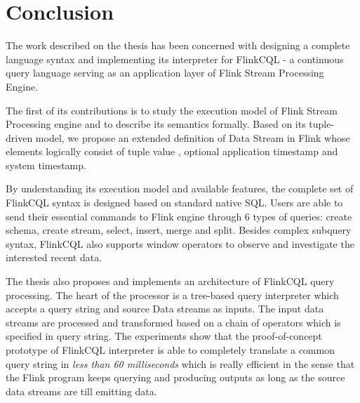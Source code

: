 
\chapter{Conclusion}

\ifpdf
    \graphicspath{{Chapter06/Figs/Raster/}{Chapter06/Figs/PDF/}{Chapter06/Figs/}}
\else
    \graphicspath{{Chapter06/Figs/Vector/}{Chapter06/Figs/}}
\fi


The work described on the thesis has been concerned with  designing  a complete language syntax and implementing its interpreter for FlinkCQL - a continuous query language serving as an application layer of Flink Stream Processing Engine. 

The first of its contributions is to study the execution model of Flink Stream Processing engine and to describe its semantics formally. Based on its tuple-driven model, we propose an extended definition of Data Stream in Flink whose elements logically consist of tuple value , optional application timestamp and system timestamp.  

By understanding its execution model and available features, the complete set of FlinkCQL syntax is designed based on standard native SQL. Users are able to send their essential commands to Flink engine through 6 types of queries: create schema, create stream, select, insert, merge and split. Besides complex subquery syntax, FlinkCQL also supports window operators to observe and investigate the interested recent data. 

The thesis also proposes and implements an architecture of FlinkCQL query processing. The heart of the processor is a tree-based query interpreter which accepts a query string and source Data streams as inputs. The input data streams are processed and transformed based on a chain of operators which is specified in query string. The experiments show  that the proof-of-concept prototype of FlinkCQL interpreter is able to completely translate a common query string in \textit{less than 60 milliseconds} which is really efficient in the sense that the Flink program keeps querying and producing outputs  as long as the source data streams are till emitting data. 




